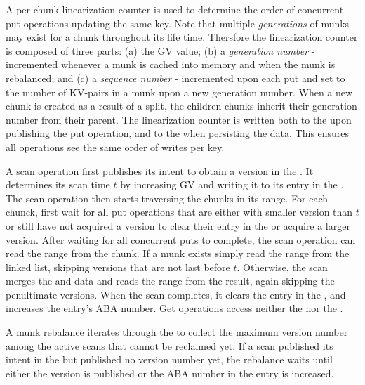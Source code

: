 A per-chunk linearization counter is used to determine the order of concurrent put operations updating the same key.  
Note that multiple \emph{generations} of munks may exist for a chunk throughout its life time.
Thersfore the linearization counter is composed of three parts: (a) the GV value; (b) a \emph{generation number} - incremented whenever a munk is cached into memory and when the munk is rebalanced; and (c) a \emph{sequence number} - incremented upon each put and set to the number of KV-pairs in a munk upon a new generation number. When a new chunk is created as a result of a split, the children chunks inherit their generation number from their parent. The linearization counter is written both to the  upon publishing the put operation, and to the  when persisting the data. This ensures all operations see the same order of writes per key.

A scan operation first publishes its intent to obtain a version in the . It determines its scan time $t$ by increasing GV and writing it to its entry in the . The scan operation then starts traversing the chunks in its range. For each chunck, first wait for all put operations that are either with smaller version than $t$ or still have not acquired a version to clear their entry in the  or acquire a larger version. After waiting for all concurrent puts to complete, the scan operation can read the range from the chunk. If a munk exists simply read the range from the linked list, skipping versions that are not last before $t$. Otherwise, the scan merges the  and  data and reads the range from the result, again skipping the penultimate versions. When the scan completes, it clears the entry in the , and increases the entry's ABA number. Get operations access neither the  nor the .%

A munk rebalance iterates through the  to collect the maximum version number among the active scans that cannot be reclaimed yet. If a scan published its intent in the  but published no version number yet, the rebalance waits until either the version is published or the ABA number in the entry is increased. 

